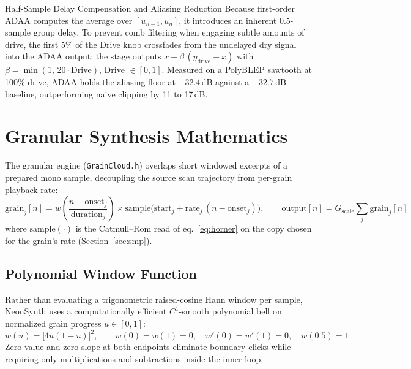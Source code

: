 \documentclass[11pt,letterpaper]{article}
\newcommand{\code}[1]{\texttt{\textcolor{codegray}{#1}}}
\begin{document}
\begin{callout}{Half-Sample Delay Compensation and Aliasing Reduction}
Because first-order ADAA computes the average over $[u_{n-1}, u_n]$, it introduces an inherent 0.5-sample group
delay. To prevent comb filtering when engaging subtle amounts of drive, the first 5\% of the Drive knob
crossfades from the undelayed dry signal into the ADAA output: the stage outputs $x + \beta\,(y_{\mathrm{drive}} - x)$ with
$\beta = \min(1,\, 20\cdot\mathrm{Drive})$, Drive $\in[0,1]$. Measured on a PolyBLEP sawtooth at 100\%
drive, ADAA holds the aliasing floor at $-32.4$\,dB against a $-32.7$\,dB baseline, outperforming naive clipping
by 11 to 17\,dB.
\end{callout}

\newpage
\section{Granular Synthesis Mathematics}\label{sec:gran}

The granular engine (\code{GrainCloud.h}) overlaps short windowed excerpts of a prepared mono sample, decoupling
the source scan trajectory from per-grain playback rate:
\begin{equation}\label{eq:grain}
  \mathrm{grain}_j[n] = w\!\left(\frac{n - \mathrm{onset}_j}{\mathrm{duration}_j}\right) \times \mathrm{sample}\bigl(\mathrm{start}_j + \mathrm{rate}_j\,(n - \mathrm{onset}_j)\bigr), \qquad
  \mathrm{output}[n] = G_{\mathrm{scale}} \sum_j \mathrm{grain}_j[n]
\end{equation}
where $\mathrm{sample}(\cdot)$ is the Catmull--Rom read of eq.~\eqref{eq:horner} on the copy chosen for the grain's rate (Section~\ref{sec:smp}).

\subsection{Polynomial Window Function}

Rather than evaluating a trigonometric raised-cosine Hann window per sample, NeonSynth uses a computationally
efficient $C^1$-smooth polynomial bell on normalized grain progress $u \in [0,1]$:
\begin{equation}\label{eq:window}
  w(u) = \bigl[4u(1-u)\bigr]^2, \qquad w(0) = w(1) = 0, \quad w'(0) = w'(1) = 0, \quad w(0.5) = 1
\end{equation}
Zero value and zero slope at both endpoints eliminate boundary clicks while requiring only multiplications and
subtractions inside the inner loop.
\end{document}
